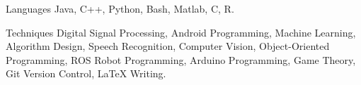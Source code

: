 

\begin{cvskills}
\cvskill
{Languages} %
{Java, C++, Python, Bash, Matlab, C, R.} %

\vspace{.1in}
\cvskill
{Techniques} %
{Digital Signal Processing, Android Programming, Machine Learning, Algorithm Design, Speech Recognition, Computer Vision, Object-Oriented Programming, ROS Robot Programming, Arduino Programming, Game Theory, Git Version Control, LaTeX Writing.} %



\end{cvskills}
